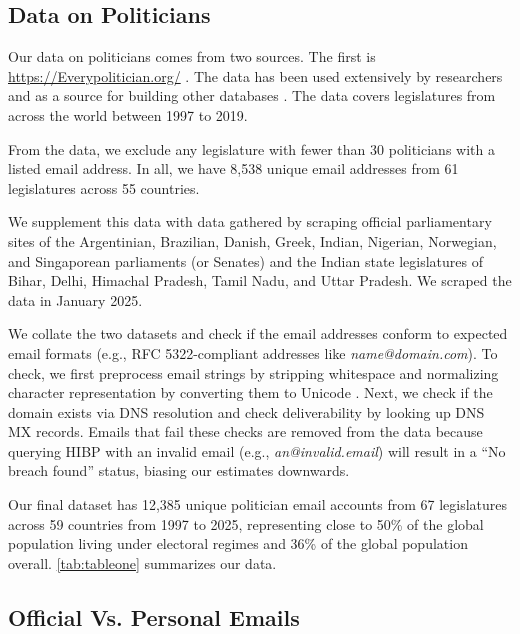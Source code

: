\documentclass[12pt, letterpaper]{article}
\begin{document}
\subsection{Data on Politicians}\label{sec:emails}
Our data on politicians comes from two sources. The first is \href{EveryPolitician.org}{https://Everypolitician.org/} \citep{mysociety2018}. The data has been used extensively by researchers \citep[see, for e.g.,][]{eshima2022just, stockemer2018age, martini2024, Kosinski2024} and as a source for building other databases \citep{kurz2023introducing, stockemer2022introducing}. The data covers legislatures from across the world between 1997 to 2019. 

From the data, we exclude any legislature with fewer than 30 politicians with a listed email address. In all, we have 8,538 unique email addresses from 61 legislatures across 55 countries.

We supplement this data with data gathered by scraping official parliamentary sites of the Argentinian, Brazilian, Danish, Greek, Indian, Nigerian, Norwegian, and Singaporean parliaments (or Senates) and the Indian state legislatures of Bihar, Delhi, Himachal Pradesh, Tamil Nadu, and Uttar Pradesh. We scraped the data in January 2025.

We collate the two datasets and check if the email addresses conform to expected email formats (e.g., RFC 5322-compliant addresses like \textit{name@domain.com}). To check, we first preprocess email strings by stripping whitespace and normalizing character representation by converting them to Unicode \citep{pev}. Next, we check if the domain exists via DNS resolution and check deliverability by looking up DNS MX records. Emails that fail these checks are removed from the data because querying HIBP with an invalid email (e.g., \textit{an@invalid.email}) will result in a ``No breach found'' status, biasing our estimates downwards.

Our final dataset has 12,385 unique politician email accounts from 67 legislatures across 59 countries from 1997 to 2025, representing close to 50\% of the global population living under electoral regimes \citep{RoW, owid} and 36\% of the global population overall. \cref{tab:tableone} summarizes our data.



\subsection{Official Vs. Personal Emails}
\end{document}
